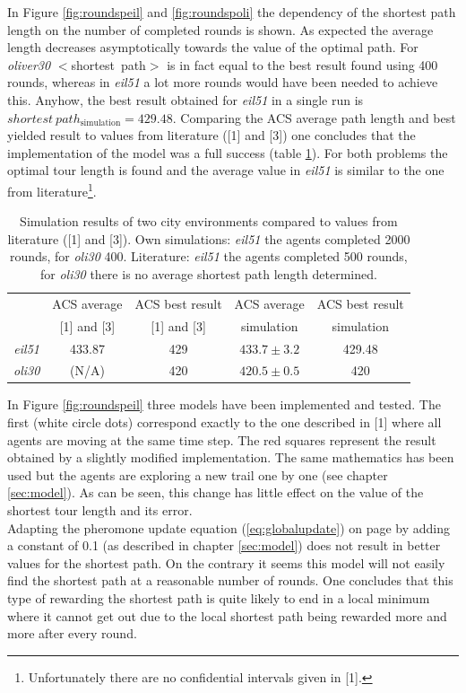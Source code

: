 \noindent In Figure \ref{fig:roundspeil} and \ref{fig:roundspoli} the dependency of the shortest path length on the number of completed rounds is shown. As expected the average length decreases asymptotically towards the value of the optimal path. For \emph{oliver30} $<$shortest~path$>$ is in fact equal to the best result found using 400 rounds, whereas in \emph{eil51} a lot more rounds would have been needed to achieve this. Anyhow, the best result obtained for \emph{eil51} in a single run is $shortest~path_{\text{simulation}}=429.48$. Comparing the ACS average path length and best yielded result to values from literature ([1] and [3]) one concludes that the implementation of the model was a full success (table \ref{tab:val}). For both problems the optimal tour length is found and the average value in \emph{eil51} is similar to the one from literature\footnote{Unfortunately there are no confidential intervals given in [1].}.

\begin{table}[h!]
\renewcommand{\arraystretch}{1.2}
\center
\begin{tabular}{|c|c|c|c|c|}
	\hline
		&ACS average				&		ACS best result				& 	ACS average		&	ACS best result \\
		&[1] and [3]	&		[1] and [3]		&	simulation	&	simulation \\\hline	
	
		\emph{eil51}	&  433.87	&	429 	& $433.7 \pm 3.2$ & 429.48 	\\\hline
		\emph{oli30}	&  (N/A)	  	&	420		& $420.5 \pm 0.5$ & 420		\\\hline
		

		
\end{tabular}
\caption{Simulation results of two city environments compared to values from literature ([1] and [3]). Own simulations: \emph{eil51} the agents completed 2000 rounds, for \emph{oli30} 400. Literature: \emph{eil51} the agents completed 500 rounds, for \emph{oli30} there is no average shortest path length determined.}
\label{tab:val}
\end{table}
\noindent In Figure \ref{fig:roundspeil} three models have been implemented and tested. The first (white circle dots) correspond exactly to the one described in [1] where all agents are moving at the same time step. The red squares represent the result obtained by a slightly modified implementation. The same mathematics has been used but the agents are exploring a new trail one by one (see chapter \ref{sec:model}). As can be seen, this change has little effect on the value of the shortest tour length and its error.\\ Adapting the pheromone update equation (\ref{eq:globalupdate}) on page \pageref{eq:globalupdate} by adding a constant of 0.1 (as described in chapter \ref{sec:model}) does not result in better values for the shortest path. On the contrary it seems this model will not easily find the shortest path at a reasonable number of rounds. One concludes that this type of rewarding the shortest path is quite likely to end in a local minimum where it cannot get out due to the local shortest path being rewarded more and more after every round.\\


